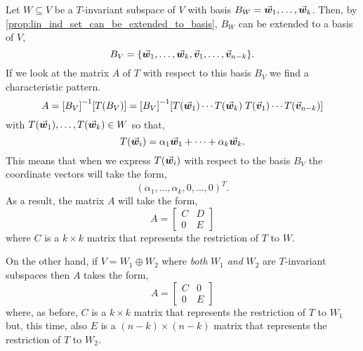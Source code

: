 \documentclass[MathsNotesBase.tex]{subfiles}
\begin{document}
{		\medskip
		Let ${ W \subseteq V }$ be a $T$-invariant subspace of $V$ with basis ${ B_W = \vec{\bm{w}}_1,\dots,\vec{\bm{w}}_k }$. Then, by \autoref{prop:lin_ind_set_can_be_extended_to_basis}, $B_W$ can be extended to a basis of $V$,
		\[ B_V = \{ \vec{\bm{w}}_1,\dots,\vec{\bm{w}}_k, \vec{\bm{v}}_1,\dots,\vec{\bm{v}}_{n-k} \}. \]
		If we look at the matrix $A$ of $T$ with respect to this basis $B_V$ we find a characteristic pattern.
		\[ A = {[B_V]}^{-1}[T(B_V)] = {[B_V]}^{-1}[T(\vec{\bm{w}}_1) \cdots T(\vec{\bm{w}}_k) \; T(\vec{\bm{v}}_1) \cdots T(\vec{\bm{v}}_{n-k})] \]
		with ${ T(\vec{\bm{w}}_1), \dots, T(\vec{\bm{w}}_k) \in W }$ so that,
		\[ T(\vec{\bm{w}}_i) = \alpha_1\vec{\bm{w}}_1 + \cdots + \alpha_k\vec{\bm{w}}_k. \] 
		This means that when we express $T(\vec{\bm{w}}_i)$ with respect to the basis $B_V$ the coordinate vectors will take the form,
		\[ (\alpha_1,\dots,\alpha_k,0,\dots,0)^T. \]
		As a result, the matrix $A$ will take the form,
		\[ A = \begin{bmatrix}
				C & D\\
				0 & E
				\end{bmatrix}\label{eq:invariant_space_block_decomposition}
		\]
		where $C$ is a ${ k \times k }$ matrix that represents the restriction of $T$ to $W$.\\
		
		
		On the other hand, if ${ V = W_1 \oplus W_2 }$ where \textit{both} $W_1$ \textit{and} $W_2$ are $T$-invariant subspaces then $A$ takes the form,
		\[ A = \begin{bmatrix}
				C & 0\\
				0 & E
				\end{bmatrix} 
		\]
		where, as before, $C$ is a ${ k \times k }$ matrix that represents the restriction of $T$ to $W_1$ but, this time, also $E$ is a ${ (n-k) \times (n-k) }$ matrix that represents the restriction of $T$ to $W_2$.
		
		\smallskip{}
		
		\bigskip
}
\end{document}
